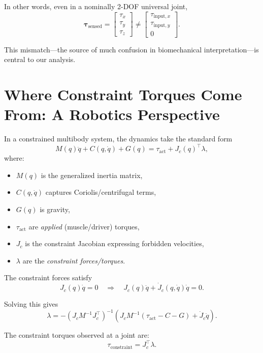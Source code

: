 \documentclass[11pt]{article}
\begin{document}
In other words, even in a nominally 2-DOF universal joint,
\[
\bm{\tau}_{\text{sensed}} = 
\begin{bmatrix}
\tau_x \\[3pt]
\tau_y \\[3pt]
\tau_z
\end{bmatrix}
\neq 
\begin{bmatrix}
\tau_{\text{input},x} \\[3pt]
\tau_{\text{input},y} \\[3pt]
0 
\end{bmatrix}.
\]

This mismatch---the source of much confusion in biomechanical interpretation---is central to our analysis.

\section{Where Constraint Torques Come From: A Robotics Perspective}

In a constrained multibody system, the dynamics take the standard form
\begin{equation}
    M(q)\ddot{q} + C(q,\dot{q}) + G(q)
    = \tau_{\text{act}} + J_c(q)^\top \lambda,
    \label{eq:dyn}
\end{equation}
where:
\begin{itemize}
    \item $M(q)$ is the generalized inertia matrix,
    \item $C(q,\dot{q})$ captures Coriolis/centrifugal terms,
    \item $G(q)$ is gravity,
    \item $\tau_{\text{act}}$ are \emph{applied} (muscle/driver) torques,
    \item $J_c$ is the constraint Jacobian expressing forbidden velocities,
    \item $\lambda$ are the \emph{constraint forces/torques}.
\end{itemize}

The constraint forces satisfy
\[
J_c(q)\dot{q} = 0 \quad \Rightarrow \quad J_c(q)\ddot{q} + \dot{J}_c(q,\dot{q})\dot{q} = 0.
\]

Solving this gives 
\[
\lambda = -(J_c M^{-1} J_c^\top)^{-1} \left(J_c M^{-1}(\tau_{\text{act}} - C - G) + \dot{J}_c \dot{q}\right).
\]

The constraint torques observed at a joint are:
\[
\tau_{\text{constraint}} = J_c^\top \lambda.
\]
\end{document}
